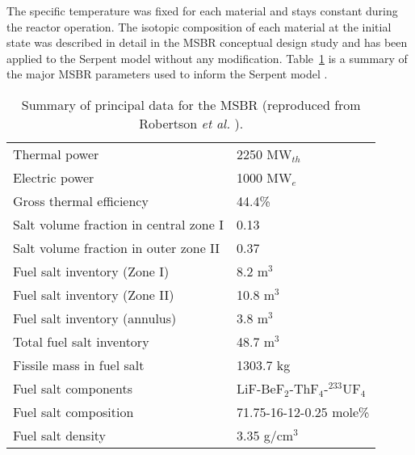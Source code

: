 The specific temperature was fixed for each material and stays constant during 
the reactor operation. The isotopic composition of each material at the 
initial state was described in detail in the MSBR conceptual design study 
\cite{robertson_conceptual_1971} and has been applied to the Serpent model 
without any modification. Table~\ref{tab:msbr_tab} is a summary of the major 
\gls{MSBR} parameters used to inform the Serpent model  
\cite{robertson_conceptual_1971}. 
\begin{table}[h!]
	\caption{Summary of principal data for the \gls{MSBR} (reproduced from 
	Robertson \emph{et al.} \cite{robertson_conceptual_1971}).}
	\begin{tabularx}{\textwidth}{ X  X}
		\hline
		Thermal power           					& 2250 MW$_{th}$\\
		Electric power             					& 1000 MW$_e$   \\
		Gross thermal efficiency       				& 44.4\%        \\
		Salt volume fraction in central zone I		& 0.13   		\\
		Salt volume fraction in outer zone II       & 0.37			\\
		Fuel salt inventory (Zone I)                & 8.2 m$^3$		\\
		Fuel salt inventory (Zone II)               & 10.8 m$^3$	\\
		Fuel salt inventory (annulus)               & 3.8 m$^3$		\\
		Total fuel salt inventory                   & 48.7 m$^3$	\\
		Fissile mass in fuel salt                   & 1303.7 kg		\\
		Fuel salt components   	& LiF-BeF$_2$-ThF$_4$-$^{233}$UF$_4$\\  
		Fuel salt composition   & 71.75-16-12-0.25 mole\%			\\
		Fuel salt density       & 3.35 g/cm$^3$         			\\ \hline
	\end{tabularx}
	\label{tab:msbr_tab}
\end{table}

